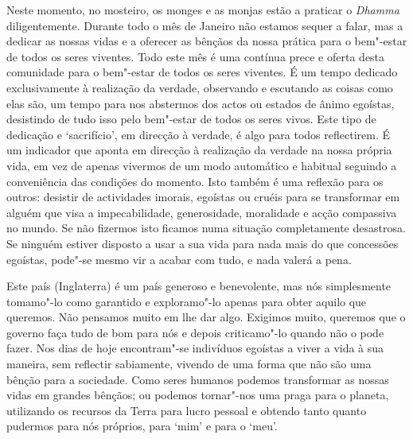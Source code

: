 Neste momento, no mosteiro, os monges e as monjas estão a praticar o
\emph{Dhamma} diligentemente. Durante todo o mês de Janeiro não estamos
sequer a falar, mas a dedicar as nossas vidas e a oferecer as bênçãos da
nossa prática para o bem"-estar de todos os seres viventes. Todo este mês
é uma contínua prece e oferta desta comunidade para o bem"-estar de todos
os seres viventes. É um tempo dedicado exclusivamente à realização da
verdade, observando e escutando as coisas como elas são, um tempo para
nos abstermos dos actos ou estados de ânimo egoístas, desistindo de tudo
isso pelo bem"-estar de todos os seres vivos. Este tipo de dedicação e
`sacrifício', em direcção à verdade, é algo para todos reflectirem. É um
indicador que aponta em direcção à realização da verdade na nossa
própria vida, em vez de apenas vivermos de um modo automático e habitual
seguindo a conveniência das condições do momento. Isto também é uma
reflexão para os outros: desistir de actividades imorais, egoístas ou
cruéis para se transformar em alguém que visa a impecabilidade,
generosidade, moralidade e acção compassiva no mundo. Se não fizermos
isto ficamos numa situação completamente desastrosa. Se ninguém estiver
disposto a usar a sua vida para nada mais do que concessões egoístas,
pode"-se mesmo vir a acabar com tudo, e nada valerá a pena.

Este país (Inglaterra) é um país generoso e benevolente, mas nós
simplesmente tomamo"-lo como garantido e exploramo"-lo apenas para obter
aquilo que queremos. Não pensamos muito em lhe dar algo. Exigimos muito,
queremos que o governo faça tudo de bom para nós e depois criticamo"-lo
quando não o pode fazer. Nos dias de hoje encontram"-se indivíduos
egoístas a viver a vida à sua maneira, sem reflectir sabiamente, vivendo
de uma forma que não são uma bênção para a sociedade. Como seres humanos
podemos transformar as nossas vidas em grandes bênçãos; ou podemos
tornar"-nos uma praga para o planeta, utilizando os recursos da Terra
para lucro pessoal e obtendo tanto quanto pudermos para nós próprios,
para `mim' e para o `meu'.

